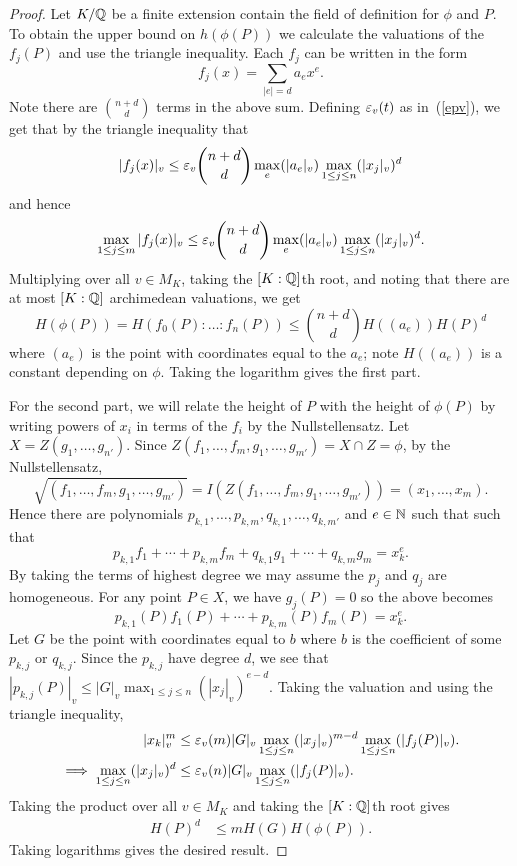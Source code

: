 \begin{proof}
Let $K/\mathbb{Q}$ be a finite extension contain the field of definition for $\phi$ and $P$. To obtain the upper bound on $h(\phi(P))$ we calculate the valuations of the $f_j(P)$ and use the triangle inequality. Each $f_j$ can be written in the form
\[
f_j(x)=\sum_{|e|=d}a_ex^e.
\]
Note there are $\binom{n+d}{d}$ terms in the above sum. 
Defining $\varepsilon_v(t)$ as in~(\ref{epv}), we get that by the triangle inequality that
\[
|f_j(x)|_v\le \varepsilon_v\binom{n+d}{d}\max_{e}(|a_e|_v)\max_{1\le j\le n}(|x_j|_v)^d
\]
and hence
\[
\max_{1\le j\le m}|f_j(x)|_v\le \varepsilon_v\binom{n+d}{d}\max_{e}(|a_e|_v)\max_{1\le j\le n}(|x_j|_v)^d.
\]
Multiplying over all $v\in M_K$, taking the $[K:\mathbb{Q}]$th root, and noting that there are at most $[K:\mathbb{Q}]$ archimedean valuations, we get
\[
H(\phi(P))=H(f_0(P):\ldots :f_n(P))\le \binom{n+d}{d} H((a_e)) H(P)^d
\]
where $(a_e)$ is the point with coordinates equal to the $a_e$; note $H((a_e))$ is a constant depending on $\phi$. Taking the logarithm gives the first part.

For the second part, we will relate the height of $P$ with the height of $\phi(P)$ by writing powers of $x_i$ in terms of the $f_i$ by the Nullstellensatz. Let $X=Z(g_1,\ldots, g_{n'})$. 
Since $Z(f_1,\ldots, f_m,g_1,\ldots, g_{m'})=X\cap Z=\phi$, by the Nullstellensatz, \[\sqrt{(f_1,\ldots, f_m,g_1,\ldots, g_{m'})}=I(Z(f_1,\ldots, f_m,g_1,\ldots, g_{m'}))=(x_1,\ldots, x_m).\]
Hence there are polynomials $p_{k,1},\ldots, p_{k,m},q_{k,1},\ldots, q_{k,m'}$ and $e\in \mathbb{N}$ such that such that
\[
p_{k,1}f_1+\cdots +p_{k,m}f_m+q_{k,1}g_1+\cdots +q_{k,m}g_m=x_k^e.
\]
By taking the terms of highest degree we may assume the $p_j$ and $q_j$ are homogeneous.
For any point $P\in X$, we have $g_j(P)=0$ so the above becomes
\[
p_{k,1}(P)f_1(P)+\cdots +p_{k,m}(P)f_m(P)=x_k^e.
\]
Let $G$ be the point with coordinates equal to $b$ where $b$ is the coefficient of some $p_{k,j}$ or $q_{k,j}$. 
Since the $p_{k,j}$ have degree $d$, we see that $|p_{k,j}(P)|_v\le |G|_v\max_{1\le j\le n}(|x_j|_v)^{e-d}$. 
Taking the valuation and using the triangle inequality, %
\begin{align*}
|x_k|_v^m&\le \varepsilon_v(m)|G|_v\max_{1\le j\le n}(|x_j|_v)^{m-d}\max_{1\le j\le n}(|f_j(P)|_v).\\
\implies
\max_{1\le j\le n}(|x_j|_v)^d&\le \varepsilon_v(n)|G|_v\max_{1\le j\le n}(|f_j(P)|_v).
\end{align*}
Taking the product over all $v\in M_K$ and taking the $[K:\mathbb{Q}]$th root gives
\begin{align*}
H(P)^d&\le mH(G)H(\phi(P)).
\end{align*}
Taking logarithms gives the desired result.
\end{proof}
